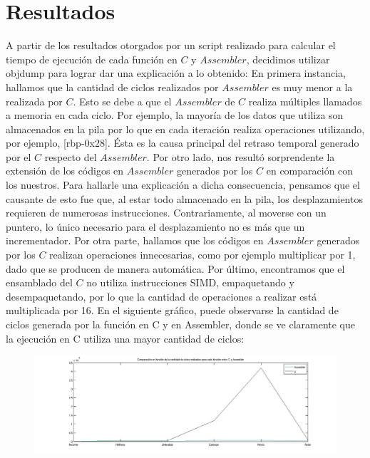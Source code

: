 \documentclass[10pt, a4paper]{article}
\begin{document}
\section{Resultados}
A partir de los resultados otorgados por un script realizado para calcular el tiempo de ejecución de cada función en $C$ y $Assembler$, decidimos utilizar objdump para lograr dar una explicación a lo obtenido:\newline
En primera instancia, hallamos que la cantidad de ciclos realizados por $Assembler$ es muy menor a la realizada por $C$. Esto se debe a que el $Assembler$ de $C$ realiza múltiples llamados a memoria en cada ciclo. Por ejemplo, la mayoría de los datos que utiliza son almacenados en la pila por lo que en cada iteración realiza operaciones utilizando, por ejemplo, [rbp-0x28]. Ésta es la causa principal del retraso temporal generado por el $C$ respecto del $Assembler$. \newline 
Por otro lado, nos resultó sorprendente la extensión de los códigos en $Assembler$ generados por los $C$ en comparación con los nuestros. Para hallarle una explicación a dicha consecuencia, pensamos que el causante de esto fue que, al estar todo almacenado en la pila, los desplazamientos requieren de numerosas instrucciones. Contrariamente, al moverse con un puntero, lo único necesario para el desplazamiento no es más que un incrementador. \newline
Por otra parte, hallamos que los códigos en $Assembler$ generados por los $C$ realizan operaciones innecesarias, como por ejemplo multiplicar por 1, dado que se producen de manera automática.\newline
Por último, encontramos que el ensamblado del $C$ no utiliza instrucciones SIMD, empaquetando y desempaquetando, por lo que la cantidad de operaciones a realizar está multiplicada por 16.\newline
En el siguiente gráfico, puede observarse la cantidad de ciclos generada por la función en C y en Assembler, donde se ve claramente que la ejecución en C utiliza una mayor cantidad de ciclos:\newline
\begin{figure}[H] %
\begin{center}
\includegraphics[width=560pt]{./velocidad.jpg}
\end{center}
\end{figure}
\end{document}
